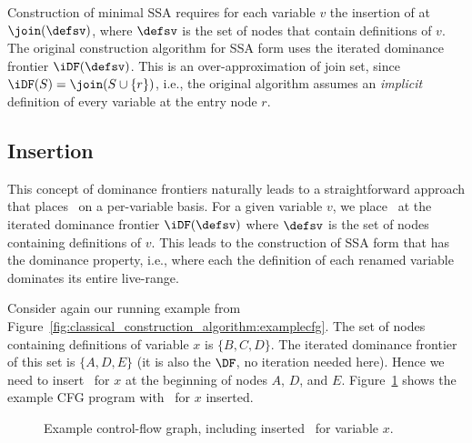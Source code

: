 {Construction of minimal SSA requires for each variable $v$ the insertion of \phifuns at $\join(\defsv)$, where $\defsv$ is the set of nodes that contain definitions of $v$. 
The original construction algorithm for SSA form uses the iterated dominance frontier $\iDF(\defsv)$. 
This is an over-approximation of join set, since $\iDF(S)=\join(S\cup \{r\})$, i.e., the original algorithm assumes an \emph{implicit} definition of every variable at the entry node $r$.


\subsection{\phifun Insertion}
\label{sec:classical_construction_algorithm:phiinsertion}
This concept of dominance frontiers naturally leads to a straightforward approach that places \phifuns\ on a per-variable basis. 
For a given variable $v$, we place \phifuns\ at the iterated dominance frontier $\iDF(\defsv)$ where $\defsv$ is the set of nodes containing definitions of $v$. 
This leads to the construction of SSA form that has the dominance property, i.e., where each the definition of each renamed variable dominates its entire live-range.

Consider again our running example from Figure~\ref{fig:classical_construction_algorithm:examplecfg}. 
The set of nodes containing definitions of variable $x$ is $\{ B,C,D \}$. 
The iterated dominance frontier of this set is $\{ A, D, E \}$ (it is also the $\DF$, no iteration needed here). 
Hence we need to insert \phifuns\ for $x$ at the beginning of nodes $A$, $D$, and $E$. 
Figure~\ref{fig:classical_construction_algorithm:examplecfg_varx} shows the example CFG program with \phifuns\ for $x$ inserted.

\begin{figure}
\caption{\label{fig:classical_construction_algorithm:examplecfg_varx}Example control-flow graph, including
inserted \phifuns\ for variable $x$.
}
\end{figure}



}
